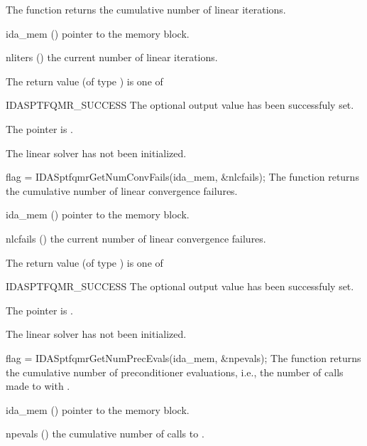 {
  The function  returns the
  cumulative number of linear iterations.
}
{
  \begin{args}[nliters]
  \item[ida\_mem] ()
    pointer to the {\ida} memory block.
  \item[nliters] ()
    the current number of linear iterations.
  \end{args}
}
{
  The return value  (of type ) is one of
  \begin{args}
  \item[IDASPTFQMR\_SUCCESS] 
    The optional output value has been successfuly set.
  \item[\Id{IDASPTFQMR\_MEM\_NULL}]
    The  pointer is .
  \item[\Id{IDASPTFQMR\_LMEM\_NULL}]
    The {\idasptfqmr} linear solver has not been initialized.
  \end{args}
}
{}
{
  flag = IDASptfqmrGetNumConvFails(ida\_mem, \&nlcfails);
}
{
  The function  returns the
  cumulative number of linear convergence failures.
}
{
  \begin{args}[nlcfails]
  \item[ida\_mem] ()
    pointer to the {\ida} memory block.
  \item[nlcfails] ()
    the current number of linear convergence failures.
  \end{args}
}
{
  The return value  (of type ) is one of
  \begin{args}
  \item[IDASPTFQMR\_SUCCESS] 
    The optional output value has been successfuly set.
  \item[\Id{IDASPTFQMR\_MEM\_NULL}]
    The  pointer is .
  \item[\Id{IDASPTFQMR\_LMEM\_NULL}]
    The {\idasptfqmr} linear solver has not been initialized.
  \end{args}
}
{}
{
  flag = IDASptfqmrGetNumPrecEvals(ida\_mem, \&npevals);
}
{
  The function  returns the
  cumulative number of preconditioner evaluations, i.e., the number of 
  calls made to  with .
}
{
  \begin{args}[npevals]
  \item[ida\_mem] ()
    pointer to the {\ida} memory block.
  \item[npevals] ()
    the cumulative number of calls to .
  \end{args}
}
